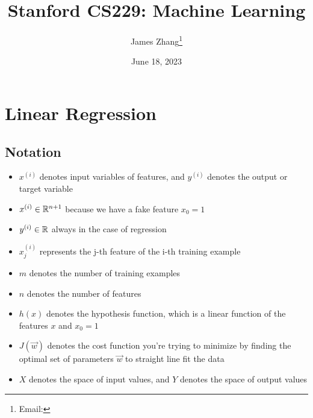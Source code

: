 \documentclass[12pt]{scrartcl}
\begin{document}
\title{Stanford CS229: Machine Learning}
\author{James Zhang\thanks{Email: }}
\date{June 18, 2023}



\maketitle
\newpage
\tableofcontents
\newpage

\section{Linear Regression}

\subsection{Notation}
\begin{itemize}
    \item $x^{(i)}$ denotes input variables of features, and $y^{(i)}$ denotes the output or target variable
    \item $x^{(i)} \in \mathbb R^{n+1}$ because we have a fake feature $x_0 = 1$
    \item $y^{(i)} \in \mathbb R$ always in the case of regression
    \item $x_j^{(i)}$ represents the j-th feature of the i-th training example
    \item $m$ denotes the number of training examples
    \item $n$ denotes the number of features
    \item $h(x)$ denotes the hypothesis function, which is a linear function of the features $x$ and $x_0 = 1$
    \item $J(\vec{w})$ denotes the cost function you're trying to minimize by finding the optimal set of parameters $\vec{w}$ to straight line fit the data
    \item $X$ denotes the space of input values, and $Y$ denotes the space of output values
\end{itemize}
\end{document}
